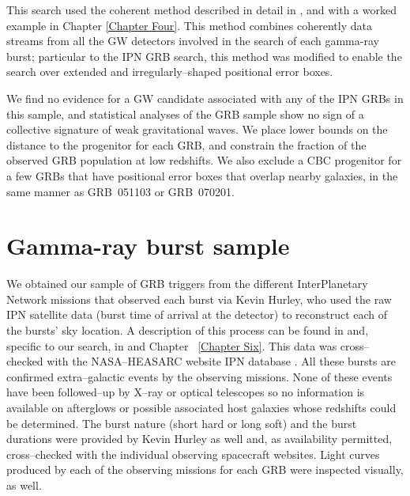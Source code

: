 This search used the coherent method described in detail in \cite{Harry:2010fr}, and with a worked example in Chapter \ref{Chapter Four}. This method combines coherently data streams from all the \ac{GW} detectors involved in the search of each gamma-ray burst; particular to the IPN GRB search, this method was modified to enable the search over extended and irregularly--shaped positional error boxes.

We find no evidence for a \ac{GW} candidate associated with any of the IPN GRBs in this sample, and statistical analyses of the GRB sample show no sign of a collective signature of weak gravitational waves. We place lower bounds on the distance to the progenitor for each GRB, and constrain the fraction of the observed GRB population at low redshifts. We also exclude a \ac{CBC} progenitor for a few GRBs that have positional error boxes that overlap nearby galaxies, in the same manner as GRB~051103 or GRB~070201.

\section{Gamma-ray burst sample}

We obtained our sample of GRB triggers from the different InterPlanetary Network missions that observed each burst via Kevin Hurley, who used the raw IPN satellite data (burst time of arrival at the detector) to reconstruct each of the bursts' sky location. A description of this process can be found in \cite{Hurley:1999ym} and, specific to our search, in \cite{Predoi:2011aa} and Chapter ~\ref{Chapter Six}. This data was cross--checked with the NASA--HEASARC website IPN database \cite{heasarc}. All these bursts are confirmed extra--galactic events by the observing missions. None of these events have been followed--up by X--ray or optical telescopes so no information is available on afterglows or possible associated host galaxies whose redshifts could be determined. The burst nature (short hard or long soft) and the burst durations were provided by Kevin Hurley as well and, as availability permitted, cross--checked with the individual observing spacecraft websites. Light curves produced by each of the observing missions for each GRB were inspected visually, as well.

